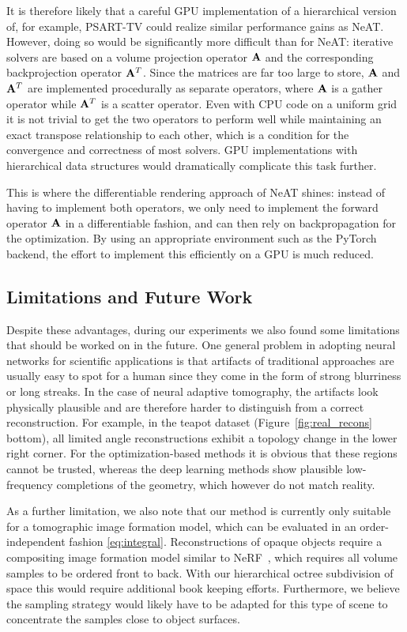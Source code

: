 \documentclass[acmtog,nonacm]{acmart} \acmSubmissionID{0438}
\newcommand{\neat}{NeAT\xspace}
\begin{document}
It is therefore likely that a careful GPU implementation of a
hierarchical version of, for example, PSART-TV could realize similar
performance gains as \neat. However, doing so would be significantly
more difficult than for \neat: iterative solvers are based on a volume
projection operator $\mmat{A}$ and the corresponding backprojection
operator $\mmat{A}^T$. Since the matrices are far too large to store,
$\mmat{A}$ and $\mmat{A}^T$ are implemented procedurally as separate
operators, where $\mmat{A}$ is a gather operator while $\mmat{A}^T$ is
a scatter operator. Even with CPU code on a uniform grid it is not
trivial to get the two operators to perform well while maintaining an
exact transpose relationship to each other, which is a condition for
the convergence and correctness of most solvers. GPU implementations
with hierarchical data structures would dramatically complicate this
task further.

This is where the differentiable rendering approach of \neat shines:
instead of having to implement both operators, we only need to
implement the forward operator $\mmat{A}$ in a differentiable fashion,
and can then rely on backpropagation for the optimization. By using an
appropriate environment such as the PyTorch backend, the effort to
implement this efficiently on a GPU is much reduced.


\subsection{Limitations and Future Work}
Despite these advantages, during our experiments we also found some limitations that should be worked on in the future.
One general problem in adopting neural networks for scientific applications is that artifacts of traditional approaches are usually easy to spot for a human since they come in the form of strong blurriness or long streaks.
In the case of neural adaptive tomography, the artifacts look
physically plausible and are therefore harder to distinguish from a
correct reconstruction.
For example, in the teapot dataset (Figure~\ref{fig:real_recons}
bottom), all limited angle reconstructions exhibit a topology change
in the lower right corner. For the optimization-based methods it is
obvious that these regions cannot be trusted, whereas the deep
learning methods show plausible low-frequency completions of the
geometry, which however do not match reality.


As a further limitation, we also note that our method is currently
only suitable for a tomographic image formation model, which can be
evaluated in an order-independent fashion
\eqref{eq:integral}. Reconstructions of opaque objects require a
compositing image formation model similar to
NeRF~\cite{mildenhall2020nerf}, which requires all volume samples to
be ordered front to back. With our hierarchical octree subdivision of
space this would require additional book keeping efforts. Furthermore,
we believe the sampling strategy would likely have to be adapted for
this type of scene to concentrate the samples close to object
surfaces.  
\end{document}
